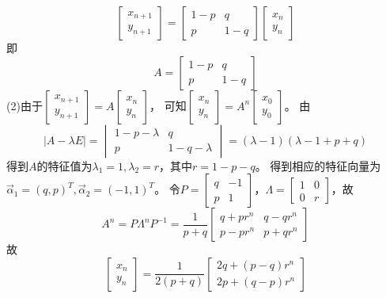 \documentclass[a4paper]{book}
\begin{document}
\begin{equation*}
\begin{bmatrix}x_{n+1}\\y_{n+1}\end{bmatrix}=
\begin{bmatrix}1-p&q\\p&1-q\end{bmatrix}
\begin{bmatrix}x_n\\y_n\end{bmatrix}
\end{equation*}
即
\begin{equation*}
A=\begin{bmatrix}1-p&q\\p&1-q\end{bmatrix}
\end{equation*}
(2)由于$\begin{bmatrix}x_{n+1}\\y_{n+1}\end{bmatrix}=A\begin{bmatrix}x_n\\y_n\end{bmatrix}$，
可知$\begin{bmatrix}x_{n}\\y_{n}\end{bmatrix}=A^n\begin{bmatrix}x_0\\y_0\end{bmatrix}$。
由
\begin{equation*}
  |A-\lambda E|=\begin{vmatrix}1-p-\lambda&q\\p&1-q-\lambda\end{vmatrix}=(\lambda-1)(\lambda-1+p+q)
\end{equation*}
得到$A$的特征值为$\lambda_1=1,\lambda_2=r$，其中$r=1-p-q$。
得到相应的特征向量为$\vec{\alpha}_1=(q,p)^T,\vec{\alpha}_2=(-1,1)^T$。
令$P=\begin{bmatrix}q&-1\\p&1\end{bmatrix}$，$\Lambda=\begin{bmatrix}1&0\\0&r\end{bmatrix}$，故
\begin{equation*}
  A^n=P\Lambda^nP^{-1}=\frac{1}{p+q}\begin{bmatrix}q+pr^n&q-qr^n\\p-pr^n&p+qr^n\end{bmatrix}
\end{equation*}
故
\begin{equation*}
 \begin{bmatrix}x_{n}\\y_{n}\end{bmatrix}=\frac{1}{2(p+q)}\begin{bmatrix}2q+(p-q)r^n\\2p+(q-p)r^n\end{bmatrix}
\end{equation*}
\end{document}
